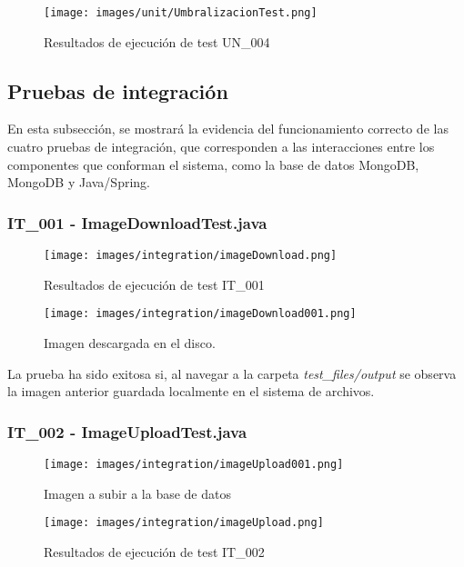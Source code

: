 \documentclass{scrreprt}
\begin{document}
\begin{figure}[H]
	\centering
    \texttt{[image: images/unit/UmbralizacionTest.png]}
    \caption{Resultados de ejecución de test UN_004}
\end{figure}



\subsection{Pruebas de integración}

En esta subsección, se mostrará la evidencia del funcionamiento correcto de las cuatro pruebas de integración, que corresponden a las interacciones entre los componentes que conforman el sistema, como la base de datos MongoDB, MongoDB y Java/Spring.

\subsubsection{IT_001 - ImageDownloadTest.java}

\begin{figure}[H]
	\centering
    \texttt{[image: images/integration/imageDownload.png]}
    \caption{Resultados de ejecución de test IT_001}
\end{figure}

\begin{figure}[H]
	\centering
    \texttt{[image: images/integration/imageDownload001.png]}
    \caption{Imagen descargada en el disco.}
\end{figure}

La prueba ha sido exitosa si, al navegar a la carpeta \textit{test_files/output} se observa la imagen anterior guardada localmente en el sistema de archivos.


\subsubsection{IT_002 - ImageUploadTest.java}

\begin{figure}[H]
	\centering
    \texttt{[image: images/integration/imageUpload001.png]}
    \caption{Imagen a subir a la base de datos}
\end{figure}

\begin{figure}[H]
	\centering
    \texttt{[image: images/integration/imageUpload.png]}
    \caption{Resultados de ejecución de test IT_002}
\end{figure}
\end{document}
